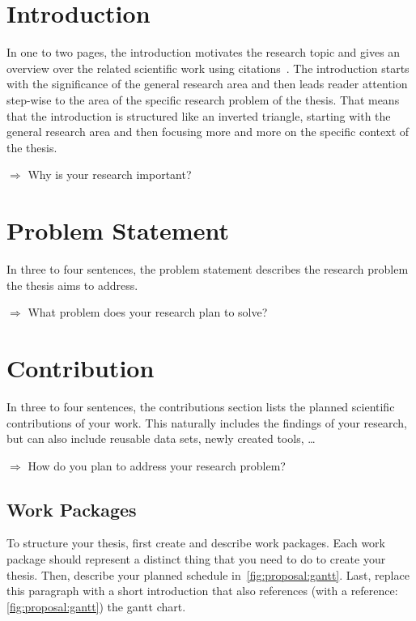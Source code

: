 
\section*{Introduction}
In one to two pages, the introduction motivates the research topic and gives an overview over the related scientific work using citations~\cite{TBK:ICSE09}.
The introduction starts with the significance of the  general research area and then leads reader attention step-wise to the area of the specific research problem of the thesis.
That means that the introduction is structured like an inverted triangle, starting with the general research area and then focusing more and more on the specific context of the thesis.

$\Rightarrow$ Why is your research important?

\section*{Problem Statement}
In three to four sentences, the problem statement describes the research problem the thesis aims to address.

$\Rightarrow$ What problem does your research plan to solve?

\section*{Contribution}
In three to four sentences, the contributions section lists the planned scientific contributions of your work.
This naturally includes the findings of your research, but can also include reusable data sets, newly created tools, \dots

$\Rightarrow$ How do you plan to address your research problem?

\subsection*{Work Packages}
To structure your thesis, first create and describe work packages. Each work package should represent a distinct thing that you need to do to create your thesis. Then, describe your planned schedule in~\cref{fig:proposal:gantt}. Last, replace this paragraph with a short introduction that also references (with a reference: \cref{fig:proposal:gantt}) the gantt chart.

\begin{enumerate}
\end{enumerate}

